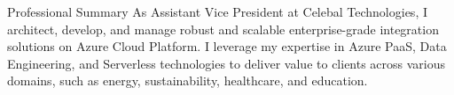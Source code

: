 \documentclass{resume} %
\begin{document}
    
    
    
    \begin{rSection}{Professional Summary}
        {As Assistant Vice President at Celebal Technologies, I architect, develop, and manage robust and scalable enterprise-grade integration solutions on Azure Cloud Platform. I leverage my expertise in Azure PaaS, Data Engineering, and Serverless technologies to deliver value to clients across various domains, such as energy, sustainability, healthcare, and education.}
    \end{rSection}
    
    
\end{document}
